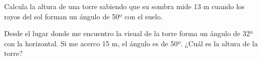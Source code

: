 \documentclass[addpoints,spanish, 12pt,a4paper]{exam}
\begin{document}
\begin{questions}
\addpoints


\question[1]  Calcula la altura de una torre sabiendo que su sombra mide 13 m cuando los rayos del
sol forman un ángulo de 50º con el suelo.
\begin{solution}  \end{solution}

\question[2]   Desde el lugar donde me encuentro la visual de la torre forma un ángulo de 32º con la
horizontal. Si me acerco 15 m, el ángulo es de 50º. ¿Cuál es la altura de la torre?
\begin{solution}  \end{solution}


\end{questions}
\end{document}
